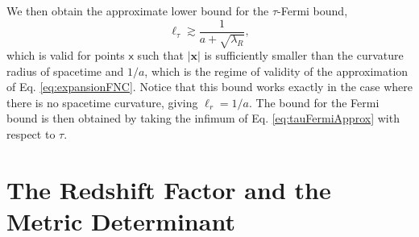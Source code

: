 \documentclass[letterpaper,12pt,titlepage,oneside,final]{book}
\newcommand{\mf}{\mathsf}%
\begin{document}
We then obtain the approximate lower bound for the $\tau$-Fermi bound,
\begin{equation}\label{eq:tauFermiApprox}
    \ell_\tau \gtrsim \frac{1}{a+\sqrt{\lambda_R}},
\end{equation}
which is valid for points $\mf x$ such that $|\bm x|$ is sufficiently smaller than the curvature radius of spacetime and $1/a$, which is the regime of validity of the approximation of Eq. \eqref{eq:expansionFNC}. Notice that this bound works exactly in the case where there is no spacetime curvature, giving \mbox{$\ell_r = 1/a$}. The bound for the Fermi bound is then obtained by taking the infimum of Eq. \eqref{eq:tauFermiApprox} with respect to $\tau$.





\chapter{The Redshift Factor and the Metric Determinant}\label{app:det}
\end{document}

